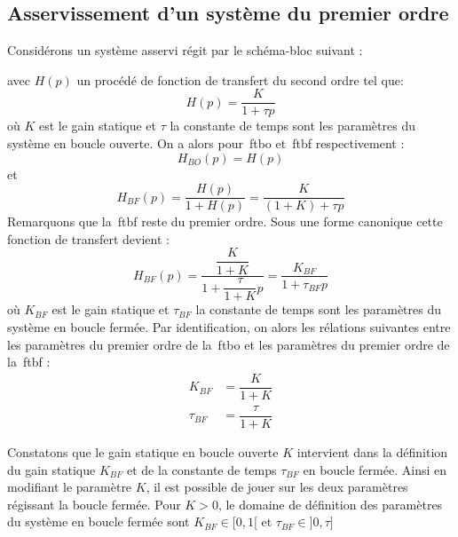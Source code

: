 \subsection{Asservissement d'un système du premier ordre}

Considérons un système asservi régit par le schéma-bloc suivant :
\begin{center}
\end{center}
avec $H(p)$ un procédé de fonction de transfert du second ordre tel que:
$$
H(p)=\dfrac{K}{1+\tau p}
$$
où $K$ est le gain statique et $\tau$ la constante de temps sont les 
paramètres du système en boucle ouverte.
On a alors pour~\gls{ftbo} et~\gls{ftbf} respectivement :
$$
H_{BO}(p)=H(p)
$$
et 
$$
H_{BF}(p)=\dfrac{H(p)}{1+H(p)}=\dfrac{K}{(1+K)+\tau p}
$$
Remarquons que la~\gls{ftbf} reste du premier ordre. Sous une forme canonique
cette fonction de transfert devient :
$$
H_{BF}(p)=\dfrac{\dfrac{K}{1+K}}{1+\dfrac{\tau}{1+K}p}=\dfrac{K_{BF}}{1+\tau_{BF} p}
$$
où $K_{BF}$ est le gain statique et $\tau_{BF}$ la constante de temps sont les 
paramètres du système en boucle fermée.
Par identification, on alors les rélations suivantes entre les paramètres du premier ordre 
de la~\gls{ftbo} et les paramètres du premier ordre de la~\gls{ftbf} :
\begin{align*}
       K_{BF}&=\dfrac{K}{1+K}\\
    \tau_{BF}&=\dfrac{\tau}{1+K}
\end{align*}

Constatons que le gain statique en boucle ouverte $K$ intervient 
dans la définition du gain statique $K_{BF}$ et de la constante de temps $\tau_{BF}$ en boucle fermée. 
Ainsi en modifiant le paramètre $K$, il est possible de jouer sur les deux paramètres régissant la boucle fermée.
Pour $K>0$, le domaine de définition des paramètres du système en boucle fermée sont  $K_{BF}\in[0,1[$ et  $\tau_{BF}\in]0,\tau]$

